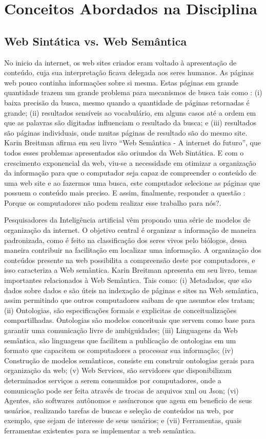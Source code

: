 \chapter{Conceitos Abordados na Disciplina}\label{cap5}

\section{Web Sintática vs. Web Semântica}

No inicio da internet, os web sites criados eram voltado à apresentação de conteúdo, cuja sua interpretação ficava delegada aos seres humanos. As páginas web pouco continha informações sobre si mesma. Estas páginas em grande quantidade trazem um grande problema para mecanismos de busca tais como : (i) baixa precisão da busca, mesmo quando a quantidade de páginas retornadas é grande; (ii) resultados sensíveis ao vocabulário, em alguns casos até a ordem em que as palavras são digitadas influenciam o resultado da busca; e (iii) resultados são páginas individuais, onde muitas páginas de resultado são do mesmo site.  Karin Breitman afirma em seu livro “Web Semântica - A internet do futuro”, que todos esses problemas apresentados são oriundos da Web Sintática. E com o crescimento exponencial da web, viu-se a necessidade em otimizar a organização da informação para que o computador seja capaz de compreender o conteúdo de uma web site e ao fazermos uma busca, este computador selecione as páginas que possuem o conteúdo mais preciso. E assim, finalmente, responder a questão : Porque os computadores não podem realizar esse trabalho para nós?.

Pesquisadores da Inteligência artificial vêm propondo uma série de modelos de organização da internet. O objetivo central é organizar a informação de maneira padronizada, como é feito na classificação dos seres vivos pelo biólogos, dessa maneira contribuir na facilitação em localizar uma informação. A organização dos conteúdos presente na web possibilita a compreensão deste por computadores, e isso caracteriza a Web semântica. Karin Breitman apresenta em seu livro, temas importantes relacionados à Web Semântica. Tais como: (i) Metadados, que são dados sobre dados e são úteis na indexação de páginas e sites na Web semântica, assim permitindo que outros computadores saibam de que assuntos eles tratam; (ii) Ontologias, são especificações formais e explicitas de conceitualizações compartilhadas. Ontologias são modelos conceituais que servem como base para garantir uma comunicação livre de ambiguidades; (iii) Linguagens da Web semântica, são linguagens que facilitem a publicação de ontologias em um formato que capacitem os computadores a processar sua informação; (iv) Construção de modelos semânticos, consiste em construir ontologias gerais para organização da web; (v) Web Services, são servidores que disponibilizam determinados serviços a serem consumidos por computadores, onde a comunicação pode ser feita através de trocas de arquivos xml ou Json; (vi) Agentes, são softwares autônomos e assíncronos que agem em beneficio de seus usuários, realizando tarefas de buscas e seleção de conteúdos na web, por exemplo, que sejam de interesse de seus usuários; e (vii) Ferramentas, quais ferramentas existentes para se implementar a web semântica.

